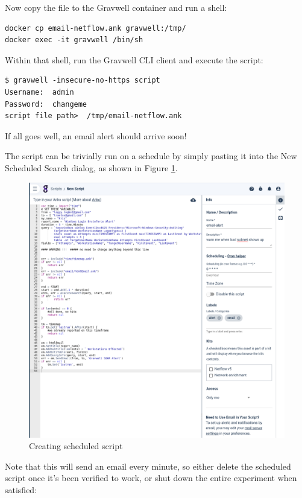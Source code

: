 Now copy the file to the Gravwell container and run a shell:

\begin{Verbatim}[breaklines=true]
docker cp email-netflow.ank gravwell:/tmp/
docker exec -it gravwell /bin/sh
\end{Verbatim}

Within that shell, run the Gravwell CLI client and execute the script:

\begin{Verbatim}[breaklines=true]
$ gravwell -insecure-no-https script
Username:  admin
Password:  changeme
script file path>  /tmp/email-netflow.ank
\end{Verbatim}

If all goes well, an email alert should arrive soon!

The script can be trivially run on a schedule by simply pasting it into
the New Scheduled Search dialog, as shown in Figure \ref{fig:lab-create-script}.

\begin{figure}
	\includegraphics{images/lab-create-script.png}
	\caption{Creating scheduled script}
	\label{fig:lab-create-script}
\end{figure}

Note that this will send an email every minute, so either delete the
scheduled script once it's been verified to work, or shut down the
entire experiment when satisfied:

